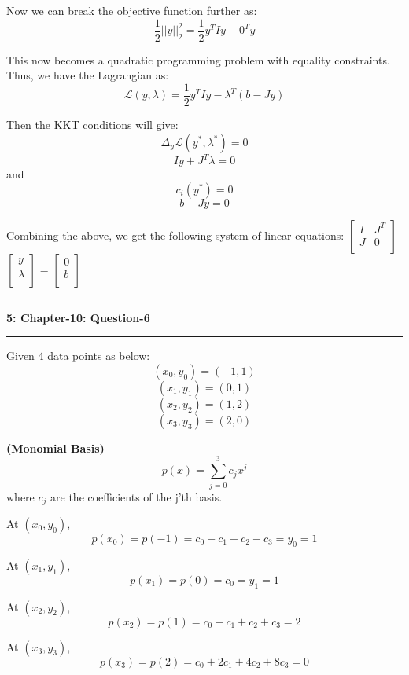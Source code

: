 \documentclass{article}
\newcommand\question[2]{\vspace{.25in}\hrule\textbf{#1: #2}\hrule\vspace{.10in}}
\renewcommand\part[1]{\vspace{.10in}\textbf{(#1)}}
\begin{document}
Now we can break the objective function further as:
\[ \dfrac{1}{2}||y||_2^2 = \dfrac{1}{2}y^T I y - 0^T y\]

This now becomes a quadratic programming problem with equality constraints. Thus, we have the Lagrangian as:
\[ \mathcal{L}(y,\lambda) = \dfrac{1}{2}y^T I y - \lambda^T(b - Jy) \]

Then the KKT conditions will give:
\[ \Delta_y\mathcal{L}(y^*, \lambda^*) = 0 \]
\begin{equation}
	Iy + J^T\lambda = 0
	\label{eq:kkt1}
\end{equation}
and
\[ c_i(y^*) = 0\]
\begin{equation}
	 b - Jy = 0
	 \label{eq:kkt2}
\end{equation}

Combining the above, we get the following system of linear equations: \newline
$\begin{bmatrix}
	I & J^T \\
	J & 0 \\
\end{bmatrix}$ $\begin{bmatrix}
			y \\
			\lambda \\
		\end{bmatrix}$ = $\begin{bmatrix}
					0 \\
					b \\
				  \end{bmatrix}$

\question{5}{Chapter-10: Question-6}
Given 4 data points as below:
\[(x_0,y_0) = (-1,1)\]
\[(x_1,y_1) = (0,1)\]
\[(x_2,y_2) = (1,2)\]
\[(x_3,y_3) = (2,0)\]

\part{Monomial Basis} 
\[ p(x) = \sum_{j=0}^3 c_jx^j\]
where $c_j$ are the coefficients of the j'th basis. \newline

At $(x_0, y_0)$, 
\[p(x_0) = p(-1) = c_0 - c_1 + c_2 - c_3 = y_0 = 1\]

At $(x_1, y_1)$,
\[p(x_1) = p(0) = c_0 = y_1 = 1\]

At $(x_2, y_2)$,
\[ p(x_2) = p(1) = c_0 + c_1 + c_2 + c_3 = 2 \]

At $(x_3, y_3)$,
\[ p(x_3) = p(2) = c_0 + 2c_1 + 4c_2 + 8c_3 = 0\]
\end{document}
